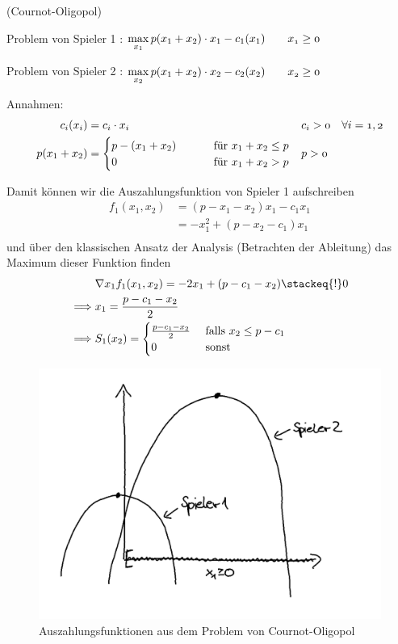 \begin{beispiel}(Cournot-Oligopol)

Problem von Spieler 1 : $\max\limits_{x_1} p(x_1 + x_2) \cdot x_1 - c_1(x_1) \qquad \mit x_1 \geq 0$ 

Problem von Spieler 2 : $\max\limits_{x_2} p(x_1 + x_2) \cdot x_2 - c_2(x_2) \qquad \mit x_2 \geq 0$ 

Annahmen:
\begin{align*}
	c_{i}(x_{i}) &= c_{i} \cdot x_{i}&  &\mit c_{i} > 0 \quad \forall i=1,2 \\
	p(x_1 + x_2) &= \begin{cases}
		p-(x_1 + x_2) &\qquad \text{ für } x_1 +x_2 \leq p \\
		0 &\qquad \text{ für } x_1 + x_2 > p
	\end{cases}& &\mit p > 0 
\end{align*}

Damit können wir die Auszahlungsfunktion von Spieler 1
aufschreiben
\begin{align*}
	f_1(x_1, x_2) &= (p-x_1 -x_2) x_1 - c_1x_1 \\
				  &= -x_1^2 + (p-x_2-c_1)x_1 \\
\end{align*}
und über den klassischen Ansatz der Analysis (Betrachten der Ableitung) das Maximum dieser Funktion finden
\begin{align*}
	&\nabla x_1f_1(x_1,x_2) = -2x_1 +(p-c_1-x_2) \stackeq{!} 0 \\
	\implies &x_1 = \frac{p-c_1-x_2}{2} \\
	\implies &S_1(x_2) = \begin{cases}
		\frac{p-c_1-x_2}{2} &\text{ falls } x_2 \leq p-c_1 \\
		0 &\text{ sonst}
	\end{cases}
\end{align*}

\begin{figure}[ht!]
\begin{center}
	\includegraphics[scale=0.6]{pics/0.png}
\end{center}
\caption{Auszahlungsfunktionen aus dem Problem von Cournot-Oligopol}
\label{fig:CournotOligopolBsp_1}
\end{figure}


\end{beispiel}
